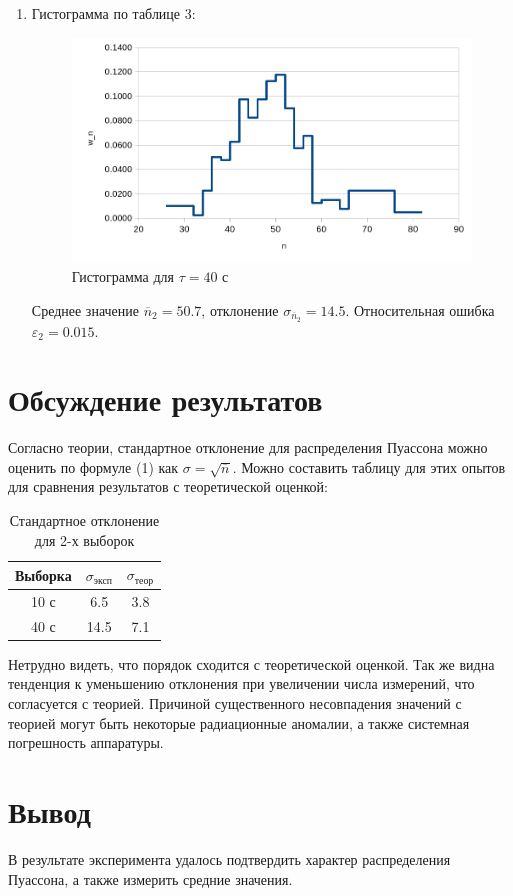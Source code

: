 \documentclass[a4paper, 12pt]{article}
\begin{document}
\begin{enumerate}
		\item Гистограмма по таблице 3:
		\begin{figure}[H]
			\centering
			\caption{Гистограмма для $\tau = 40$ с}
			\includegraphics[scale = 0.4]{data/hist_20.png}
		\end{figure}

		Среднее значение $\overline{n}_2 = 50.7$, отклонение $\sigma_{\overline{n}_2} = 14.5$.
		Относительная ошибка $\varepsilon_2 = 0.015$.
	\end{enumerate}

	\section{Обсуждение результатов}
	Согласно теории, стандартное отклонение для распределения Пуассона можно
	оценить по формуле (1) как $\sigma = \sqrt{\overline{n}}$. Можно составить таблицу для
	этих опытов для сравнения результатов с теоретической оценкой:
	\begin{table}[H]
		\centering
		\caption{Стандартное отклонение для 2-х выборок}
		\begin{tabular}{|c|c|c|}
			\hline
			Выборка	& $\sigma_{\text{эксп}}$ & $\sigma_{\text{теор}}$ \\ \hline
			10 с    & 6.5                    & 3.8					  \\ \hline
			40 с	& 14.5					 & 7.1					  \\ \hline
		\end{tabular}
	\end{table}

	Нетрудно видеть, что порядок сходится с теоретической оценкой. Так же видна
	тенденция к уменьшению отклонения при увеличении числа измерений, что согласуется
	с теорией. Причиной существенного несовпадения значений с теорией могут быть
	некоторые радиационные аномалии, а также системная погрешность аппаратуры.

	\section{Вывод}
	В результате эксперимента удалось подтвердить характер распределения Пуассона, а также
	измерить средние значения.
\end{document}
